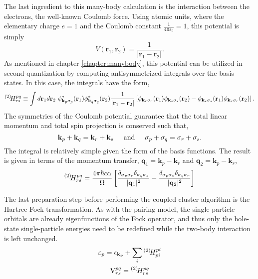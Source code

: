\documentclass[thesis.tex]{subfiles}
\begin{document}
The last ingredient to this many-body calculation is the interaction between the electrons, the well-known Coulomb force.  Using atomic units, where the elementary charge $e = 1$ and the Coulomb constant $\frac{1}{4\pi\varepsilon_{0}} = 1$, this potential is simply
\begin{equation} \label{eq:coulomb}
  V\left( \mathbf{r}_{1}, \mathbf{r}_{2}\right) = \frac{1}{\lvert \mathbf{r}_{1} - \mathbf{r}_{2} \rvert}.
\end{equation}
As mentioned in chapter \ref{chapter:manybody}, this potential can be utilized in second-quantization by computing antisymmetrized integrals over the basis states.  In this case, the integrals have the form,
\begin{equation} \label{eq:coloumb_integral}
  {}^{\left(2\right)}\hspace{-2pt}H^{pq}_{rs} \equiv \int d\mathbf{r}_{1} d\mathbf{r}_{2}\  \phi^{*}_{\mathbf{k}_{p}\sigma_{p}}(\mathbf{r}_{1})\phi^{*}_{\mathbf{k}_{q}\sigma_{q}}(\mathbf{r}_{2}) \frac{1}{\lvert \mathbf{r}_{1} - \mathbf{r}_{2} \rvert} \left[\phi_{\mathbf{k}_{r}\sigma_{r}}(\mathbf{r}_{1})\phi_{\mathbf{k}_{s}\sigma_{s}}(\mathbf{r}_{2}) - \phi_{\mathbf{k}_{s}\sigma_{s}}(\mathbf{r}_{1})\phi_{\mathbf{k}_{r}\sigma_{r}}(\mathbf{r}_{2})\right].
\end{equation}
The symmetries of the Coulomb potential guarantee that the total linear momentum and total spin projection is conserved such that,
\begin{equation} \label{eq:coulomb-conserve}
  \mathbf{k}_{p} + \mathbf{k}_{q} = \mathbf{k}_{r} + \mathbf{k}_{s} \hspace{0.5cm} \text{and} \hspace{0.5cm} \sigma_{p} + \sigma_{q} = \sigma_{r} + \sigma_{s}.
\end{equation}
The integral is relatively simple given the form of the basis functions. The result is given in terms of the momentum transfer, $\mathbf{q}_{1} = \mathbf{k}_{p} - \mathbf{k}_{r}$ and $\mathbf{q}_{2} = \mathbf{k}_{p} - \mathbf{k}_{r}$,
\begin{equation} \label{eq:coulomb-int}
  {}^{\left(2\right)}\hspace{-2pt}H^{pq}_{rs} = \frac{4\pi \hbar c \alpha}{\Omega}\left[ \frac{\delta_{\sigma_{p}\sigma_{r}}\delta_{\sigma_{q}\sigma_{s}}}{\lvert \mathbf{q}_{1} \rvert^{2}} - \frac{\delta_{\sigma_{p}\sigma_{s}}\delta_{\sigma_{q}\sigma_{r}}}{\lvert \mathbf{q}_{2} \rvert^{2}} \right]
\end{equation}

The last preparation step before performing the coupled cluster algorithm is the Hartree-Fock transformation.  As with the pairing model, the single-particle orbitals are already eigenfunctions of the Fock operator, and thus only the hole-state single-particle energies need to be redefined while the two-body interaction is left unchanged.
\begin{gather}\label{eq:infinite_hf}
  \varepsilon_{p} = \epsilon_{\mathbf{k}_{p}} + \sum_{i}{}^{\left(2\right)}\hspace{-2pt}H^{pi}_{pi} \notag \\
  \text{V}^{pq}_{rs} = {}^{\left(2\right)}\hspace{-2pt}H^{pq}_{rs}
\end{gather}
\end{document}
